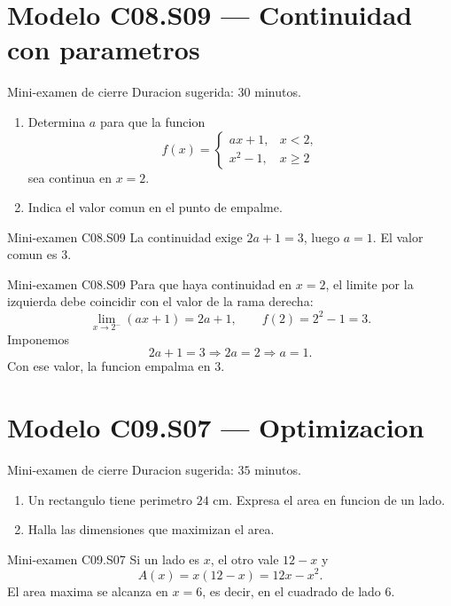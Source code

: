 \section{Modelo C08.S09 --- Continuidad con parametros}

\begin{exambrief}{Mini-examen de cierre}
Duracion sugerida: \(30\) minutos.
\begin{enumerate}
  \item Determina \(a\) para que la funcion
  \[
  f(x)=
  \begin{cases}
    ax+1, & x<2,\\
    x^2-1, & x\geq 2
  \end{cases}
  \]
  sea continua en \(x=2\).
  \item Indica el valor comun en el punto de empalme.
\end{enumerate}
\end{exambrief}

\begin{shortanswer}{Mini-examen C08.S09}
La continuidad exige \(2a+1=3\), luego \(a=1\). El valor comun es \(3\).
\end{shortanswer}

\begin{fullsolution}{Mini-examen C08.S09}
Para que haya continuidad en \(x=2\), el limite por la izquierda debe coincidir con el valor de
la rama derecha:
\[
\lim_{x\to 2^-}(ax+1)=2a+1,
\qquad
f(2)=2^2-1=3.
\]
Imponemos
\[
2a+1=3 \Longrightarrow 2a=2 \Longrightarrow a=1.
\]
Con ese valor, la funcion empalma en \(3\).
\end{fullsolution}

\section{Modelo C09.S07 --- Optimizacion}

\begin{exambrief}{Mini-examen de cierre}
Duracion sugerida: \(35\) minutos.
\begin{enumerate}
  \item Un rectangulo tiene perimetro \(24\) cm. Expresa el area en funcion de un lado.
  \item Halla las dimensiones que maximizan el area.
\end{enumerate}
\end{exambrief}

\begin{shortanswer}{Mini-examen C09.S07}
Si un lado es \(x\), el otro vale \(12-x\) y
\[
A(x)=x(12-x)=12x-x^2.
\]
El area maxima se alcanza en \(x=6\), es decir, en el cuadrado de lado \(6\).
\end{shortanswer}

